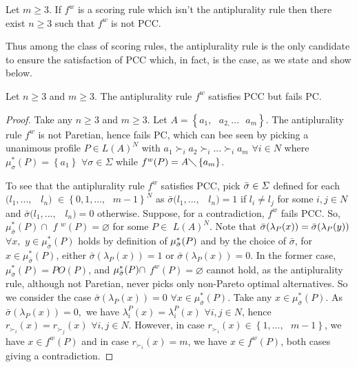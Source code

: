 \documentclass[version=3.21, pagesize, twoside=off, bibliography=totoc, DIV=calc, fontsize=12pt, a4paper]{scrartcl}
\begin{document}
\begin{proposition}
Let $m\geq 3$. If $f^w$ is a scoring rule which isn't the antiplurality
rule then there exist $n\geq 3$ such that $f^w$ is not PCC.
\end{proposition}

Thus among the class of scoring rules, the antiplurality rule is the only
candidate to ensure the satisfaction of PCC which, in fact, is the case, as
we state and show below.


\begin{proposition}
Let $n\geq 3$ and $m\geq 3.$ The antiplurality rule $f^w$ satisfies PCC
but fails PC.
\end{proposition}

\begin{proof}
Take any $n\geq 3$ and $m\geq 3.$ Let $A=\left\{ a_{1},\text{ }a_{2,}...%
\text{ }a_{m}\right\} $. The antiplurality rule $f^w$ is not Paretian,
hence fails PC, which can bee seen by picking a unanimous profile $P\in
L(A)^{N}$ with $a_{1}\succ _{i}a_{2}\succ _{i}...\succ _{i}a_{m}$ $\forall
i\in N$ where $\mu _{\sigma }^{\ast }(P)=\left\{ a_{1}\right\} $ $\forall
\sigma \in \Sigma $ while $f^w(P)=A\diagdown \left\{ a_{m}\right\} $.

To see that the antiplurality rule $f^w$ satisfies PCC, pick $\bar{%
\sigma }\in \Sigma $ defined for each $(l_{1},...,$ \ $l_{n})$ $\in \left\{
0,1,...,\text{ }m-1\right\} ^{N}$ as $\bar{\sigma }(l_{1},...,$ \ $%
l_{n})=1$ if $l_{i}\neq l_{j}$ for some $i,j\in N$ and $\bar{\sigma }%
(l_{1},...,$ \ $l_{n})=0$ otherwise. Suppose, for a contradiction, $f^w$
fails PCC. So, $\mu _{\bar{\sigma }}^{\ast }(P)\cap $ $f$ $%
^{w}(P)=\varnothing $ for some $P\in $ $L(A)^{N}$. Note that $\bar{%
\sigma }(\lambda _{P}(x))=\bar{\sigma }(\lambda _{P}(y))$ $\forall x,$ $%
y\in \mu _{\bar{\sigma }}^{\ast }(P)$ holds by definition of $\mu _{%
\bar{\sigma }}^{\ast }(P)$ and by the choice of $\bar{\sigma }$,
for $x\in \mu _{\bar{\sigma }}^{\ast }(P)$, either $\bar{\sigma }%
(\lambda _{P}(x))=1$ or $\bar{\sigma }(\lambda _{P}(x))=0$. In the
former case, $\mu _{\bar{\sigma }}^{\ast }(P)=PO(P)$, and $\mu _{%
\bar{\sigma }}^{\ast }(P)\cap $ $f^w(P)=\varnothing $ cannot hold,
as the antiplurality rule, although not Paretian, never picks only
non-Pareto optimal alternatives. So we consider the case $\bar{\sigma }%
(\lambda _{P}(x))=0$ $\forall x\in \mu _{\bar{\sigma }}^{\ast }(P)$.
Take any $x\in \mu _{\bar{\sigma }}^{\ast }(P)$. As $\bar{\sigma }%
(\lambda _{P}(x))=0,$ we have $\lambda _{i}^{P}(x)=\lambda _{i}^{P}(x)$ $%
\forall i,j\in N$, hence $r_{\succ _{i}}(x)=r_{\succ _{j}}(x)$ $\forall
i,j\in N$. However, in case $r_{\succ _{i}}(x)\in \left\{ 1,...,\text{ }%
m-1\right\} $, we have $x\in f^w(P)$ and in case $r_{\succ _{i}}(x)=m$,
we have $x\in f^w(P)$, both cases giving a contradiction.
\end{proof}
\end{document}
